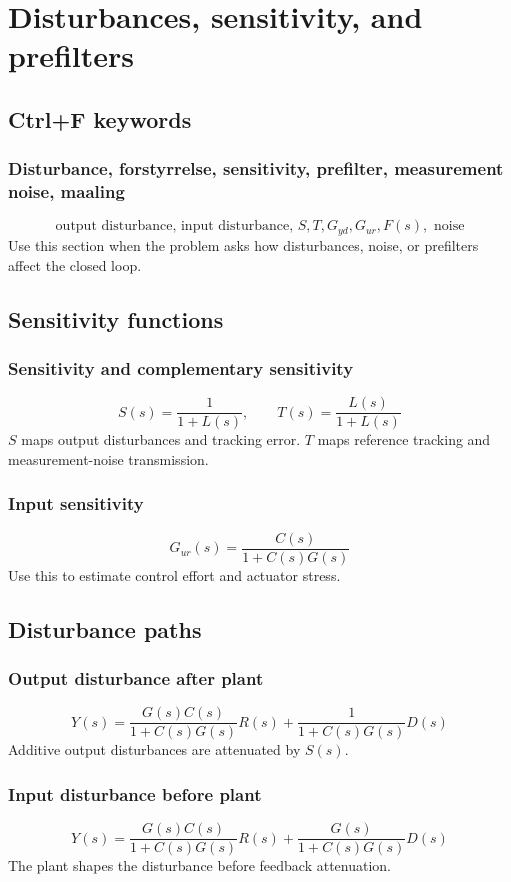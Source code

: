 \section{Disturbances, sensitivity, and prefilters}

\subsection{Ctrl+F keywords}

\subsubsection{Disturbance, forstyrrelse, sensitivity, prefilter, measurement noise, maaling}
\[
\text{output disturbance, input disturbance, }S,T,G_{yd},G_{ur},F(s),\text{ noise}
\]
Use this section when the problem asks how disturbances, noise, or prefilters affect the closed loop.

\subsection{Sensitivity functions}

\subsubsection{Sensitivity and complementary sensitivity}
\[
S(s)=\frac{1}{1+L(s)},\qquad
T(s)=\frac{L(s)}{1+L(s)}
\]
\(S\) maps output disturbances and tracking error. \(T\) maps reference tracking and measurement-noise transmission.

\subsubsection{Input sensitivity}
\[
G_{ur}(s)=\frac{C(s)}{1+C(s)G(s)}
\]
Use this to estimate control effort and actuator stress.

\subsection{Disturbance paths}

\subsubsection{Output disturbance after plant}
\[
Y(s)=\frac{G(s)C(s)}{1+C(s)G(s)}R(s)
+\frac{1}{1+C(s)G(s)}D(s)
\]
Additive output disturbances are attenuated by \(S(s)\).

\subsubsection{Input disturbance before plant}
\[
Y(s)=\frac{G(s)C(s)}{1+C(s)G(s)}R(s)
+\frac{G(s)}{1+C(s)G(s)}D(s)
\]
The plant shapes the disturbance before feedback attenuation.

